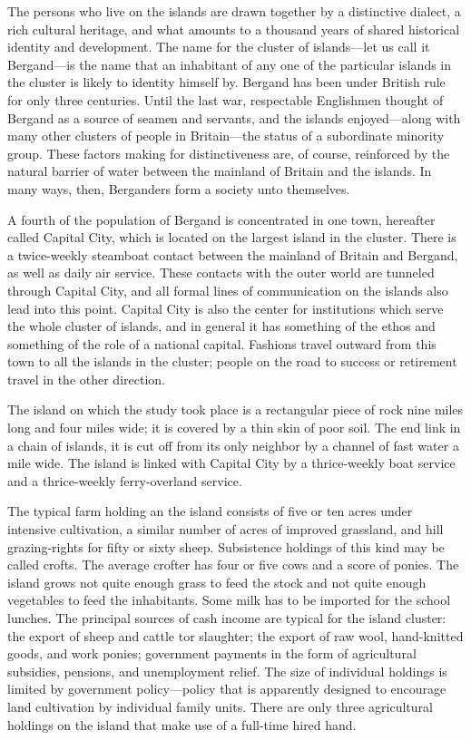 \documentclass[twoside,symmetric,nobib,justified]{tufte-book}
\begin{document}
The persons who live on the islands are drawn together by a distinctive
dialect, a rich cultural heritage, and what amounts to a thousand years
of shared historical identity and development. The name for the cluster
of islands---let us call it Bergand---is the name that an inhabitant of
any one of the particular islands in the cluster is likely to identity
himself by. Bergand has been under British rule for only three
centuries. Until the last war, respectable Englishmen thought of Bergand
as a source of seamen and servants, and the islands enjoyed---along with
many other clusters of people in Britain---the status of a subordinate
minority group. These factors making for distinctiveness are, of course,
reinforced by the natural barrier of water between the mainland of
Britain and the islands. In many ways, then, Berganders form a society
unto themselves.

A fourth of the population of Bergand is concentrated in one town,
hereafter called Capital City, which is located on the largest island in
the cluster. There is a twice-weekly steamboat contact between the
mainland of Britain and Bergand, as well as daily air service. These
contacts with the outer world are tunneled through Capital City, and all
formal lines of communication on the islands also lead into this point.
Capital City is also the center for institutions which serve the whole
cluster of islands, and in general it has something of the ethos and
something of the role of a national capital. Fashions travel outward
from this town to all the islands in the cluster; people on the road to
success or retirement travel in the other direction.

The island on which the study took place is a rectangular piece of rock
nine miles long and four miles wide; it is covered by a thin skin of
poor soil. The end link in a chain of islands, it is cut off from its
only neighbor by a channel of fast water a mile wide. The island is
linked with Capital City by a thrice-weekly boat service and a
thrice-weekly ferry-overland service.

The typical farm holding an the island consists of five or ten acres
under intensive cultivation, a similar number of acres of improved
grassland, and hill grazing-rights for fifty or sixty sheep. Subsistence
holdings of this kind may be called crofts. The average crofter has four
or five cows and a score of ponies. The island grows not quite enough
grass to feed the stock and not quite enough vegetables to feed the
inhabitants. Some milk has to be imported for the school lunches. The
principal sources of cash income are typical for the island cluster: the
export of sheep and cattle tor slaughter; the export of raw wool,
hand-knitted goods, and work ponies; government payments in the form of
agricultural subsidies, pensions, and unemployment relief. The size of
individual holdings is limited by government policy---policy that is
apparently designed to encourage land cultivation by individual family
units. There are only three agricultural holdings on the island that
make use of a full-time hired hand.
\end{document}
